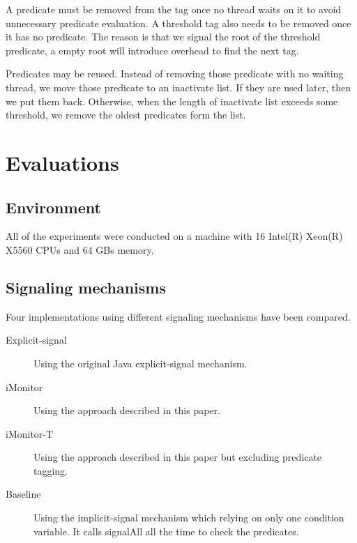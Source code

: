 \documentclass[preprint]{sigplanconf}
\begin{document}
A predicate must be removed from the tag once no thread waits on 
it to avoid unnecessary predicate evaluation. A threshold tag also needs to be
removed once it has no predicate. The reason is that 
we signal the root of the threshold predicate, a empty root 
will introduce overhead to find the next tag. 

Predicates may be reused. Instead  of removing those predicate with no waiting
thread, 
we move those predicate to an inactivate list. If they are used later, then we 
put them back. Otherwise, when the length of inactivate list exceeds some 
threshold, we remove the oldest predicates form the list.


\section{Evaluations} \label{sec:eval}
\subsection{Environment}
All of the experiments were conducted on a machine with 16 
Intel(R) Xeon(R) X5560 CPUs and 64 GBs memory. 


\subsection{Signaling mechanisms}
Four implementations using different signaling mechanisms have been 
compared. 
\begin{description}
    \item[Explicit-signal] Using the original Java explicit-signal mechanism. 
    \item[iMonitor] Using the approach described in this paper. 
    \item[iMonitor-T] Using the approach described in this paper but excluding
        predicate tagging. 
    \item[Baseline] Using the implicit-signal mechanism which relying on only
        one condition variable. It calls signalAll all the time to check the
        predicates.
\end{description}
\end{document}
